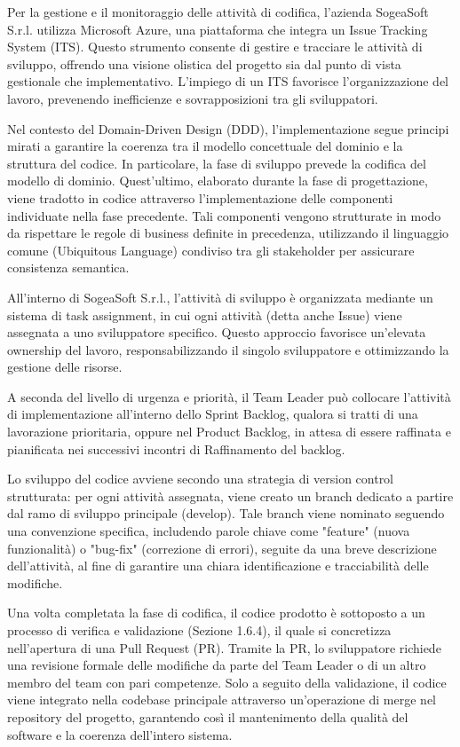         Per la gestione e il monitoraggio delle attività di codifica, l'azienda SogeaSoft S.r.l. utilizza Microsoft Azure, una piattaforma che integra un Issue Tracking System (ITS). Questo strumento consente di gestire e tracciare le attività di sviluppo, offrendo una visione olistica del progetto sia dal punto di vista gestionale che implementativo. L'impiego di un ITS favorisce l'organizzazione del lavoro, prevenendo inefficienze e sovrapposizioni tra gli sviluppatori.

        Nel contesto del Domain-Driven Design (DDD), l’implementazione segue principi mirati a garantire la coerenza tra il modello concettuale del dominio e la struttura del codice. In particolare, la fase di sviluppo prevede la codifica del modello di dominio.
        Quest'ultimo, elaborato durante la fase di progettazione, viene tradotto in codice attraverso l'implementazione delle componenti individuate nella fase precedente. Tali componenti vengono strutturate in modo da rispettare le regole di business definite in precedenza, utilizzando il linguaggio comune (Ubiquitous Language) condiviso tra gli stakeholder per assicurare consistenza semantica.
        
        All'interno di SogeaSoft S.r.l., l'attività di sviluppo è organizzata mediante un sistema di task assignment, in cui ogni attività (detta anche Issue) viene assegnata a uno sviluppatore specifico. Questo approccio favorisce un’elevata ownership del lavoro, responsabilizzando il singolo sviluppatore e ottimizzando la gestione delle risorse.

        A seconda del livello di urgenza e priorità, il Team Leader può collocare l’attività di implementazione all’interno dello Sprint Backlog, qualora si tratti di una lavorazione prioritaria, oppure nel Product Backlog, in attesa di essere raffinata e pianificata nei successivi incontri di Raffinamento del backlog.

        Lo sviluppo del codice avviene secondo una strategia di version control strutturata: per ogni attività assegnata, viene creato un branch dedicato a partire dal ramo di sviluppo principale (develop). Tale branch viene nominato seguendo una convenzione specifica, includendo parole chiave come "feature" (nuova funzionalità) o "bug-fix" (correzione di errori), seguite da una breve descrizione dell’attività, al fine di garantire una chiara identificazione e tracciabilità delle modifiche.


        Una volta completata la fase di codifica, il codice prodotto è sottoposto a un processo di verifica e validazione (Sezione 1.6.4), il quale si concretizza nell'apertura di una Pull Request (PR). Tramite la PR, lo sviluppatore richiede una revisione formale delle modifiche da parte del Team Leader o di un altro membro del team con pari competenze. Solo a seguito della validazione, il codice viene integrato nella codebase principale attraverso un'operazione di merge nel repository del progetto, garantendo così il mantenimento della qualità del software e la coerenza dell’intero sistema.

